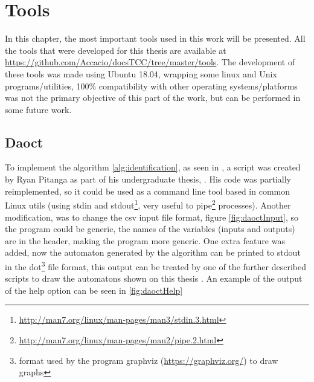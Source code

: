
\chapter{Tools}
\label{chap:Tools}

In this chapter, the most important tools used in this work will be presented.
All the tools that were developed for this thesis are available at
\url{https://github.com/Accacio/docsTCC/tree/master/tools}. The development of
these tools was made using Ubuntu 18.04, wrapping some linux and Unix
programs/utilities, 100\% compatibility with other operating systems/platforms
was not the primary objective of this part of the work, but can be performed in
some future work.

\section{Daoct}
\label{sec:daoct}

To implement the algorithm \ref{alg:identification}, as seen in
\cite{moreira2018enhanced}, a script was created by Ryan Pitanga as part of his
undergraduate thesis, \cite{pitanga2019modelo}. His code was partially
reimplemented, so it could be used as a command line tool based in common Linux
utils (using stdin and
stdout\footnote{\url{http://man7.org/linux/man-pages/man3/stdin.3.html}}, very
useful to pipe\footnote{\url{http://man7.org/linux/man-pages/man2/pipe.2.html}}
processes). Another modification, was to change the csv input file format,
figure \ref{fig:daoctInput}, so the
program could be generic, the names of the variables (inputs and outputs) are in
the header, making the program more generic. One extra feature was added,
now the automaton generated by the algorithm can be printed to stdout in the
dot\footnote{format used by the program graphviz (\url{https://graphviz.org/})
  to draw graphs} file format, this output can be treated by one of the further
described scripts to draw the automatons shown on this thesis . 
An example of the output of the help option can be seen in \ref{fig:daoctHelp}


